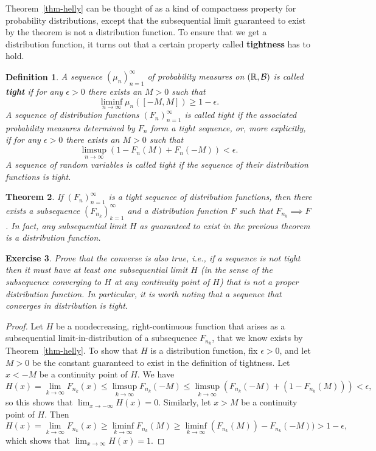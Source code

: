\documentclass[12pt]{article}
\newtheorem{thm}{Theorem}[section]
\newtheorem{defi}[thm]{Definition}
\newtheorem{exercise}[thm]{Exercise}
\newcommand{\R}{\mathbb{R}}
\theoremstyle{example}
\begin{document}
Theorem~\ref{thm-helly} can be thought of as a kind of compactness property for probability distributions, except that the subsequential limit guaranteed to exist by the theorem is not a distribution function. To ensure that we get a distribution function, it turns out that a certain property called \textbf{tightness} has to hold.

\begin{defi} A sequence $(\mu_n)_{n=1}^\infty$ of probability measures on $(\R,{\cal B})$ is called \textbf{tight} if for any $\epsilon>0$ there exists an $M>0$ such that $$ \liminf_{n\to\infty} \mu_n([-M,M]) \ge 1-\epsilon. $$
A sequence of distribution functions $(F_n)_{n=1}^\infty$ is called tight if the associated probability measures determined by $F_n$ form a tight sequence, or, more explicitly, if for any $\epsilon>0$ there exists an $M>0$ such that 
$$ \limsup_{n\to\infty} (1-F_n(M)+F_n(-M)) < \epsilon. $$
A sequence of random variables is called tight if the sequence of their distribution functions is tight.
\end{defi}

\begin{thm} If $(F_n)_{n=1}^\infty$ is a tight sequence of distribution functions, then there exists a subsequence $(F_{n_k})_{k=1}^\infty$ and a distribution function $F$ such that $F_{n_k} \implies F$. In fact, any subsequential limit $H$ as guaranteed to exist in the previous theorem is a distribution function.
\end{thm}

\begin{exercise} Prove that the converse is also true, i.e., if a sequence is not tight then it must have at least one subsequential limit $H$ (in the sense of the subsequence converging to $H$ at any continuity point of $H$) that is not a proper distribution function. In particular, it is worth noting that a sequence that converges in distribution is tight.
\end{exercise}

\begin{proof} Let $H$ be a nondecreasing, right-continuous function that arises as a subsequential limit-in-distribution of a subsequence $F_{n_k}$, that we know exists by Theorem~\ref{thm-helly}. To show that $H$ is a distribution function, fix $\epsilon>0$, and let $M>0$ be the constant guaranteed to exist in the definition of tightness. Let $x<-M$ be a continuity point of $H$. We have
$$ H(x)=\lim_{k\to\infty} F_{n_k}(x) \le \limsup_{k\to\infty} F_{n_k}(-M) \le \limsup_{k\to\infty} (F_{n_k}(-M)+(1-F_{n_k}(M)) ) < \epsilon, $$
so this shows that $\lim_{x\to-\infty} H(x) = 0. $ Similarly, let $x>M$ be a continuity point of $H$. Then
$$ H(x)=\lim_{k\to\infty} F_{n_k}(x) \ge \liminf_{k\to\infty} F_{n_k}(M) \ge \liminf_{k\to\infty} (F_{n_k}(M))-F_{n_k}(-M) ) > 1-\epsilon, $$
which shows that $\lim_{x\to\infty} H(x)=1.$
\end{proof}
\end{document}
